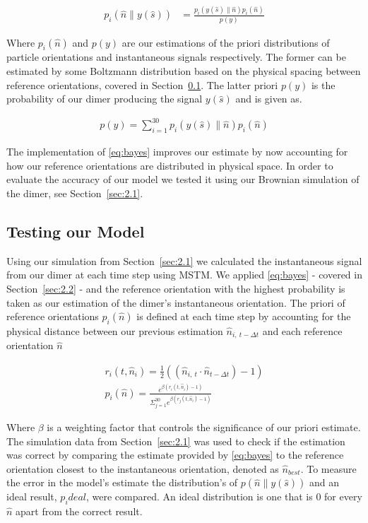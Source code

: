 \documentclass[final, 3p]{elsarticle}
\begin{document}
\begin{align}
	\label{eq:bayes}
	p_i(\hat{n}\parallel y(\hat{s}))&= \frac{p_i(y(\hat{s})\parallel\hat{n})p_i(\hat{n})}{p(y)}
\end{align}

Where $p_i(\hat{n})$ and $p(y)$ are our estimations of the priori distributions of particle orientations and instantaneous signals respectively. The former can be estimated by some Boltzmann distribution based on the physical spacing between reference orientations, covered in Section~\ref{sec:2.3}. The latter priori $p(y)$ is the probability of our dimer producing the signal $y(\hat{s})$ and is given as. 

\begin{align}
	p(y) = \sum\limits_{i=1}^{30} p_i(y(\hat{s})\parallel\hat{n})p_i(\hat{n})
 \end{align}

The implementation of \eqref{eq:bayes} improves our estimate by now accounting for how our reference orientations are distributed in physical space. In order to evaluate the accuracy of our model we tested it using our Brownian simulation of the dimer, see Section~\ref{sec:2.1}.

\subsection{Testing our Model}
\label{sec:2.3}
Using our simulation from Section~\ref{sec:2.1} we calculated the instantaneous signal from our dimer at each time step using MSTM.  We applied \eqref{eq:bayes} - covered in Section~\ref{sec:2.2} - and the reference orientation with the highest probability is taken as our estimation of the dimer's instantaneous orientation. The priori of reference orientations $p_i(\hat{n})$ is defined at each time step by accounting for the physical distance between our previous estimation $\hat{n}_{i, \ t - \Delta t}$ and each reference orientation $\hat{n}$ 

\begin{align}
	r_i(t, \hat{n}_i)= \frac{1}{2}((\hat{n}_{i,\ t} \cdot \hat{n}_{t-\Delta t})-1) \\
	p_i(\hat{n})= \frac{e^{\beta (r_i(t,\hat{n}_i)-1)}}
	{\Sigma_{j=1}^{30}e^{\beta(r_j(t, \hat{n}_i)-1)}}
\end{align}

Where $\beta$ is a weighting factor that controls the significance of our priori estimate. The simulation data from Section~\ref{sec:2.1} was used to check if the estimation was correct by comparing the estimate provided by \eqref{eq:bayes} to the reference orientation closest to the instantaneous orientation, denoted as $\hat{n}_{best}$. To measure the error in the model's estimate the distribution's of $p(\hat{n}\parallel y(\hat{s}))$ and an ideal result, $p_ideal$, were compared. An ideal distribution is one that is 0 for every $\hat{n}$ apart from the correct result. 
\end{document}
